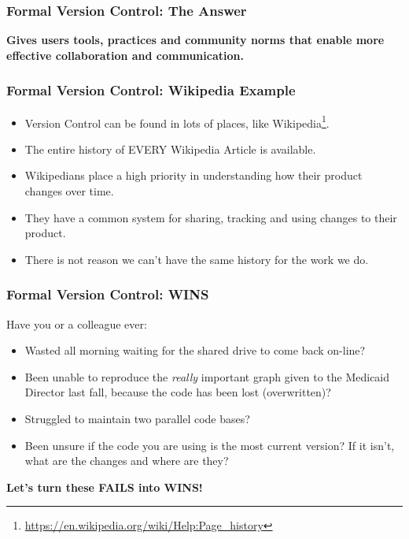 \documentclass{beamer}
\begin{document}
\begin{frame} %
  \frametitle{Formal Version Control: The Answer}

  \textbf{Gives users tools, practices and community norms that enable
    more effective collaboration and communication.}
  
 \end{frame}
 
\begin{frame} %
  \frametitle{Formal Version Control: Wikipedia Example}
  
  \begin{itemize}
  \item Version Control can be found in lots of places, like
    Wikipedia\footnote{\url{https://en.wikipedia.org/wiki/Help:Page_history}}.
  \item The entire history of EVERY Wikipedia Article is available.
  \item Wikipedians place a high priority in understanding how their
    product changes over time.
  \item They have a common system for sharing, tracking and using
  changes to their product.
  \item There is not reason we can't have the same history for the
    work we do.
  \end{itemize}

\end{frame}

\begin{frame}  %
  \frametitle{Formal Version Control: WINS}
  {\large Have you or a colleague ever:}
  \bigskip
  \begin{itemize}
  \item Wasted all morning waiting for the shared drive to come back
    on-line?
  \item Been unable to reproduce the \emph{really} important graph
    given to the Medicaid Director last fall, because the code has
    been lost (overwritten)?
  \item Struggled to maintain two parallel code bases?
  \item Been unsure if the code you are using is the most current
    version? If it isn't, what are the changes and where are they?
  \end{itemize}

  \begin{center}
    \textbf{Let's turn these FAILS into WINS!}
  \end{center}
\end{frame}
\end{document}
